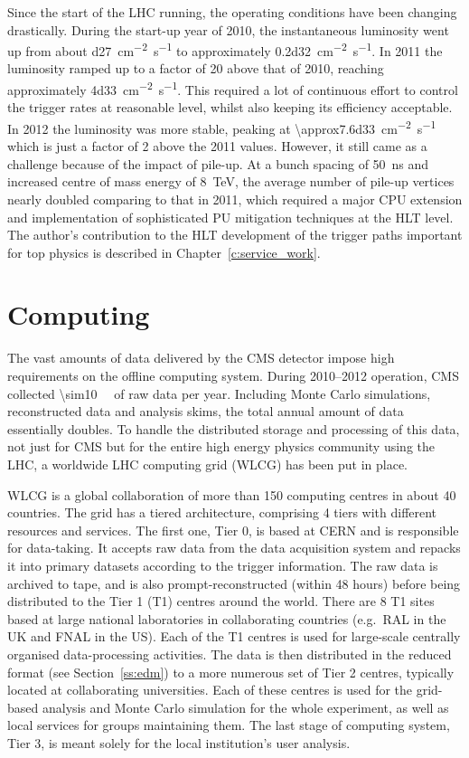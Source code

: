Since the start of the LHC running, the operating conditions have been changing drastically. During the start-up year of
2010, the instantaneous luminosity went up from about \SI{d27}{\cm^{-2} s^{-1}} to approximately \SI{0.2d32}{\cm^{-2}
s^{-1}}. In 2011 the luminosity ramped up to a factor of \num{20} above that of 2010, reaching approximately
\SI{4d33}{\cm^{-2} s^{-1}}. This required a lot of continuous effort to control the trigger rates at reasonable level,
whilst also keeping its efficiency acceptable. In 2012 the luminosity was more stable, peaking at
\SI{\approx7.6d33}{\cm^{-2} s^{-1}} which is just a factor of 2 above the 2011 values. However, it still came as a
challenge because of the impact of pile-up. At a bunch spacing of \SI{50}{\ns} and increased centre of mass energy of
\SI{8}{\TeV}, the average number of pile-up vertices nearly doubled comparing to that in 2011, which required a major
CPU extension and implementation of sophisticated PU mitigation techniques at the HLT level. The author's contribution
to the HLT development of the trigger paths important for top physics is described in Chapter~\ref{c:service_work}.

\section{Computing}
\label{s:computing}
The vast amounts of data delivered by the CMS detector impose high requirements on the offline computing system. During
2010--2012 operation, CMS collected \SI{\sim10}{\peta\byte} of raw data per year. Including Monte Carlo simulations,
reconstructed data and analysis skims, the total annual amount of data essentially doubles. To handle the distributed
storage and processing of this data, not just for CMS but for the entire high energy physics community using the LHC, a
worldwide LHC computing grid (WLCG) has been put in place.

WLCG is a global collaboration of more than 150 computing centres in about 40 countries. The grid has a tiered
architecture, comprising 4 tiers with different resources and services. The first one, Tier 0, is based at CERN and is
responsible for data-taking. It accepts raw data from the data acquisition system and repacks it into primary datasets
according to the trigger information. The raw data is archived to tape, and is also prompt-reconstructed (within 48
hours) before being distributed to the Tier 1 (T1) centres around the world. There are 8 T1 sites based at large
national laboratories in collaborating countries (e.g.\ RAL in the UK and FNAL in the US). Each of the T1 centres is
used for large-scale centrally organised data-processing activities. The data is then distributed in the reduced format
(see Section~\ref{ss:edm}) to a more numerous set of Tier 2 centres, typically located at collaborating universities.
Each of these centres is used for the grid-based analysis and Monte Carlo simulation for the whole experiment, as well
as local services for groups maintaining them. The last stage of computing system, Tier 3, is meant solely for the local
institution's user analysis.

